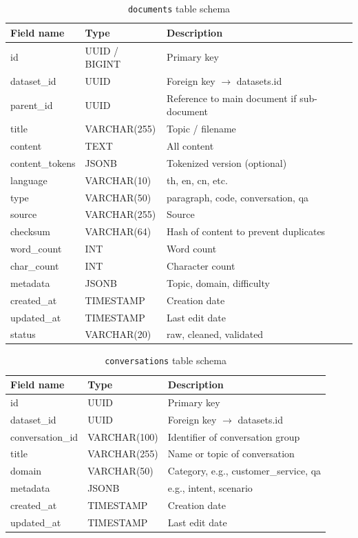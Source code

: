 \documentclass[12pt,oneside,openright,a4paper]{cpe-english-project}
\begin{document}
\begin{table}[H]
\centering
\caption{\texttt{documents} table schema}\label{tbl:db-documents}
\begin{tabular}{|p{}|p{}|p{}|}
\hline
\textbf{Field name} & \textbf{Type} & \textbf{Description} \\ \hline
id & UUID / BIGINT & Primary key \\ \hline
dataset\_id & UUID & Foreign key $\rightarrow$ datasets.id \\ \hline
parent\_id & UUID & Reference to main document if sub-document \\ \hline
title & VARCHAR(255) & Topic / filename \\ \hline
content & TEXT & All content \\ \hline
content\_tokens & JSONB & Tokenized version (optional) \\ \hline
language & VARCHAR(10) & th, en, cn, etc. \\ \hline
type & VARCHAR(50) & paragraph, code, conversation, qa \\ \hline
source & VARCHAR(255) & Source \\ \hline
checksum & VARCHAR(64) & Hash of content to prevent duplicates \\ \hline
word\_count & INT & Word count \\ \hline
char\_count & INT & Character count \\ \hline
metadata & JSONB & Topic, domain, difficulty \\ \hline
created\_at & TIMESTAMP & Creation date \\ \hline
updated\_at & TIMESTAMP & Last edit date \\ \hline
status & VARCHAR(20) & raw, cleaned, validated \\ \hline
\end{tabular}
\end{table}

\begin{table}[H]
\centering
\caption{\texttt{conversations} table schema}\label{tbl:db-conversations}
\begin{tabular}{|p{}|p{}|p{}|}
\hline
\textbf{Field name} & \textbf{Type} & \textbf{Description} \\ \hline
id & UUID & Primary key \\ \hline
dataset\_id & UUID & Foreign key $\rightarrow$ datasets.id \\ \hline
conversation\_id & VARCHAR(100) & Identifier of conversation group \\ \hline
title & VARCHAR(255) & Name or topic of conversation \\ \hline
domain & VARCHAR(50) & Category, e.g., customer\_service, qa \\ \hline
metadata & JSONB & e.g., intent, scenario \\ \hline
created\_at & TIMESTAMP & Creation date \\ \hline
updated\_at & TIMESTAMP & Last edit date \\ \hline
\end{tabular}
\end{table}
\end{document}
